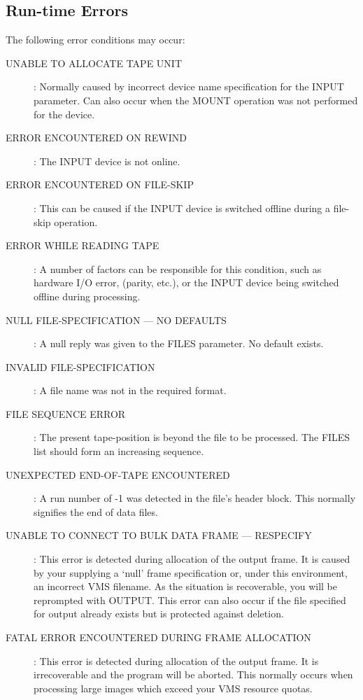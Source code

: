 \subsection {Run-time Errors}
The following error conditions may occur:
\begin{description}
\item[UNABLE TO ALLOCATE TAPE UNIT]:
Normally caused by incorrect device name specification for the INPUT parameter.
Can also occur when the MOUNT operation was not performed for the device.
\item[ERROR ENCOUNTERED ON REWIND]:
The INPUT device is not online.
\item[ERROR ENCOUNTERED ON FILE-SKIP]:
This can be caused if the INPUT device is switched offline during a file-skip
operation.
\item[ERROR WHILE READING TAPE]:
A number of factors can be responsible for this condition, such as
hardware I/O error, (parity, etc.), or the INPUT device being switched offline
during processing.
\item[NULL FILE-SPECIFICATION --- NO DEFAULTS]:
A null reply was given to the FILES parameter.
No default exists.
\item[INVALID FILE-SPECIFICATION]:
A file name was not in the required format.
\item[FILE SEQUENCE ERROR]:
The present tape-position is beyond the file to be processed.
The FILES list should form an increasing sequence.
\item[UNEXPECTED END-OF-TAPE ENCOUNTERED]:
A run number of -1 was detected in the file's header block.
This normally signifies the end of data files.
\item[UNABLE TO CONNECT TO BULK DATA FRAME --- RESPECIFY]:
This error is detected during allocation of the output frame.
It is caused by your supplying a `null' frame specification or, under this
environment, an incorrect VMS filename.
As the situation is recoverable, you will be reprompted with OUTPUT.
This error can also occur if the file specified for output already exists but is
protected against deletion.
\item[FATAL ERROR ENCOUNTERED DURING FRAME ALLOCATION]:
This error is detected during allocation of the output frame.
It is irrecoverable and the program will be aborted.
This normally occurs when processing large images which exceed your VMS resource
quotas.
\end{description}

